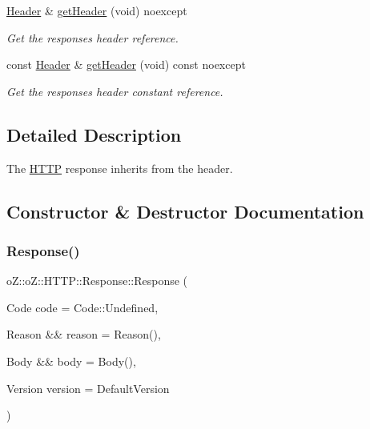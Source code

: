 \begin{DoxyCompactItemize}
\mbox{\hyperlink{classo_z_1_1o_z_1_1_h_t_t_p_1_1_header}{Header}} \& \mbox{\hyperlink{classo_z_1_1o_z_1_1_h_t_t_p_1_1_response_a38279a872d9c2c731fc43493995afabe}{get\+Header}} (void) noexcept
\begin{DoxyCompactList}\small\item\em Get the response\textquotesingle{}s header reference. \end{DoxyCompactList}\item 
const \mbox{\hyperlink{classo_z_1_1o_z_1_1_h_t_t_p_1_1_header}{Header}} \& \mbox{\hyperlink{classo_z_1_1o_z_1_1_h_t_t_p_1_1_response_a231a5ff9942da0165e02aa718baf2e75}{get\+Header}} (void) const noexcept
\begin{DoxyCompactList}\small\item\em Get the response\textquotesingle{}s header constant reference. \end{DoxyCompactList}\end{DoxyCompactItemize}


\subsection{Detailed Description}
The \mbox{\hyperlink{namespaceo_z_1_1o_z_1_1_h_t_t_p}{H\+T\+TP}} response inherits from the header. 

\subsection{Constructor \& Destructor Documentation}
\mbox{\label{classo_z_1_1o_z_1_1_h_t_t_p_1_1_response_aa5b5d0b822053603c5fde6e301e1ca67}} 
\subsubsection{\texorpdfstring{Response()}{Response()}\hspace{0.1cm}{\footnotesize\ttfamily [1/3]}}
{\footnotesize\ttfamily o\+Z\+::o\+Z\+::\+H\+T\+T\+P\+::\+Response\+::\+Response (\begin{DoxyParamCaption}\item[{Code}]{code = {\ttfamily Code\+:\+:Undefined},  }\item[{Reason \&\&}]{reason = {\ttfamily Reason()},  }\item[{Body \&\&}]{body = {\ttfamily Body()},  }\item[{Version}]{version = {\ttfamily DefaultVersion} }\end{DoxyParamCaption})\hspace{0.3cm}{\ttfamily [inline]}}



